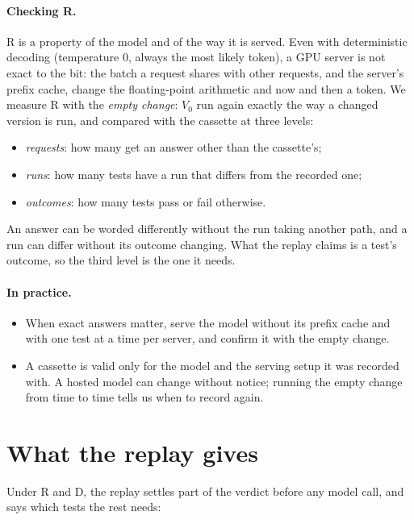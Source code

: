 \documentclass[11pt,a4paper]{article}
\begin{document}
\paragraph{Checking R.} R is a property of the model and of the way it is served. Even with deterministic decoding
(temperature 0, always the most likely token), a GPU server is not exact to the bit: the batch a request shares
with other requests, and the server's prefix cache, change the floating-point arithmetic and now and then a token.
We measure R with the \emph{empty change}: $V_0$ run again exactly the way a changed version is run, and compared
with the cassette at three levels:
\begin{itemize}
  \item \emph{requests}: how many get an answer other than the cassette's;
  \item \emph{runs}: how many tests have a run that differs from the recorded one;
  \item \emph{outcomes}: how many tests pass or fail otherwise.
\end{itemize}
An answer can be worded differently without the run taking another path, and a run can differ without its outcome
changing. What the replay claims is a test's outcome, so the third level is the one it needs.

\paragraph{In practice.}
\begin{itemize}
  \item When exact answers matter, serve the model without its prefix cache and with one test at a time per
        server, and confirm it with the empty change.
  \item A cassette is valid only for the model and the serving setup it was recorded with. A hosted model can
        change without notice; running the empty change from time to time tells us when to record again.
\end{itemize}

\section{What the replay gives}
\label{sec:gives}

Under R and D, the replay settles part of the verdict before any model call, and says which tests the rest needs:
\end{document}
